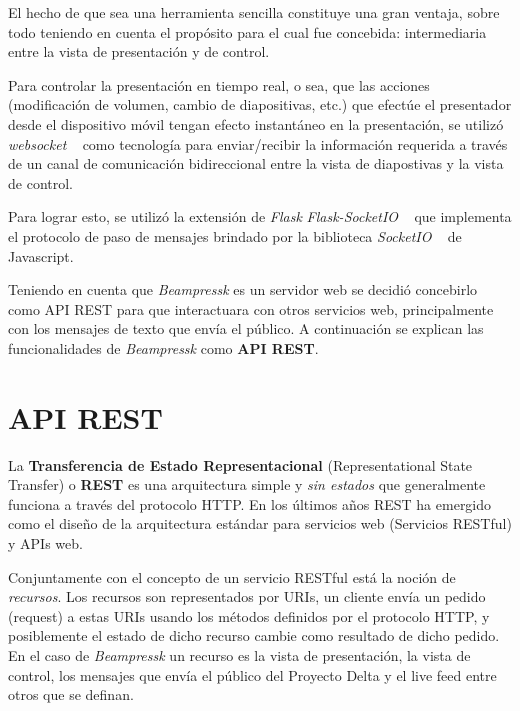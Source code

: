 		El hecho de que sea una herramienta sencilla constituye una gran ventaja, sobre todo teniendo en cuenta el propósito para el cual fue concebida: intermediaria entre la vista de presentación y de control.

		Para controlar la presentación en tiempo real, o sea, que las acciones (modificación de volumen, cambio de diapositivas, etc.) que efectúe el presentador desde el dispositivo móvil tengan efecto instantáneo en la presentación, se utilizó \textit{websocket} ~\cite{websocket} como tecnología para enviar/recibir la información requerida a través de un canal de comunicación bidireccional entre la vista de diapostivas y la vista de control.

		Para lograr esto, se utilizó la extensión de \textit{Flask} \textit{Flask-SocketIO} ~\cite{flasksocket} que implementa el protocolo de paso de mensajes brindado por la biblioteca \textit{SocketIO} ~\cite{socketio} de Javascript.

	 	Teniendo en cuenta que \textit{Beampressk} es un servidor web se decidió concebirlo como API REST para que interactuara con otros servicios web, principalmente con los mensajes de texto que envía el público. A continuación se explican las funcionalidades de \textit{Beampressk} como \textbf{API REST}.
		

		\section{API REST} %
		\label{sec:api_rest}


			La \textbf{Transferencia de Estado Representacional} (Representational State Transfer) o \textbf{REST} es una arquitectura simple y \textit{sin estados} que generalmente funciona a través del protocolo HTTP. En los últimos años REST ha emergido como el diseño de la arquitectura estándar para servicios web (Servicios RESTful) y APIs web.

			Conjuntamente con el concepto de un servicio RESTful está la noción de \textit{recursos}. Los recursos son representados por URIs, un cliente envía un pedido (request) a estas URIs usando los métodos definidos por el protocolo HTTP, y posiblemente el estado de dicho recurso cambie como resultado de dicho pedido. En el caso de \textit{Beampressk} un recurso es la vista de presentación, la vista de control, los mensajes que envía el público del Proyecto Delta y el live feed entre otros que se definan.

